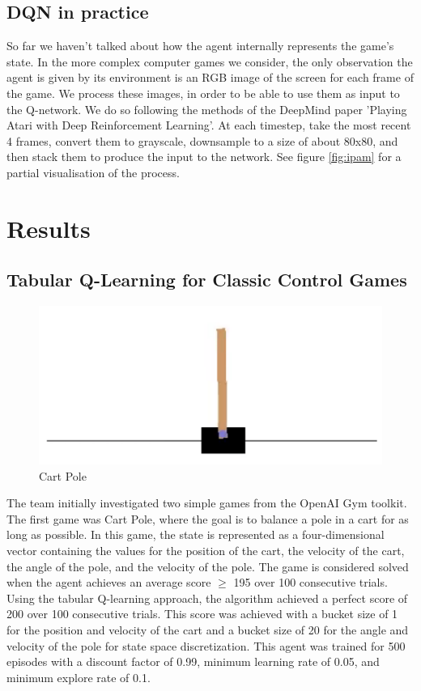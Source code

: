 \documentclass[12pt,letterpaper]{article}
\begin{document}
\subsection{DQN in practice}
So far we haven't talked about how the agent internally represents the game's state. 
In the more complex computer games we consider, the only observation the agent is given 
by its environment is an RGB image of the screen for each frame of the game. We process these images, 
in order to be able to use them as input to the Q-network. We do so following the methods of
the DeepMind paper 'Playing Atari with Deep Reinforcement Learning'. 
At each timestep, take the most recent 4 frames, convert them to grayscale, downsample to a size 
of about 80x80, and then stack them to produce the input to the network. See figure \ref{fig:ipam} 
for a partial visualisation of the process. 


\section{Results}
\subsection{Tabular Q-Learning for Classic Control Games}

\begin{figure}[h!]
\centering\includegraphics[scale=0.45,clip]{cartpole.png}
\caption{Cart Pole}
\label{fig:cartpole}
\end{figure}

The  team initially investigated two simple games from the OpenAI Gym toolkit. The first game was Cart Pole, where the goal is to balance a pole in a cart for as long as possible. In this game, the state is represented as a four-dimensional vector containing the values for the position of the cart, the velocity of the cart, the angle of the pole, and the velocity of the pole. The game is considered solved when the agent achieves an average score $\geq$ 195 over 100 consecutive trials. Using the tabular Q-learning approach, the algorithm achieved a perfect score of 200 over 100 consecutive trials. This score was achieved with a bucket size of 1 for the position and velocity of the cart and a bucket size of 20 for the angle and velocity of the pole for state space discretization. This agent was trained for 500 episodes with a discount factor of 0.99, minimum learning rate of 0.05, and minimum explore rate of 0.1.
\end{document}

